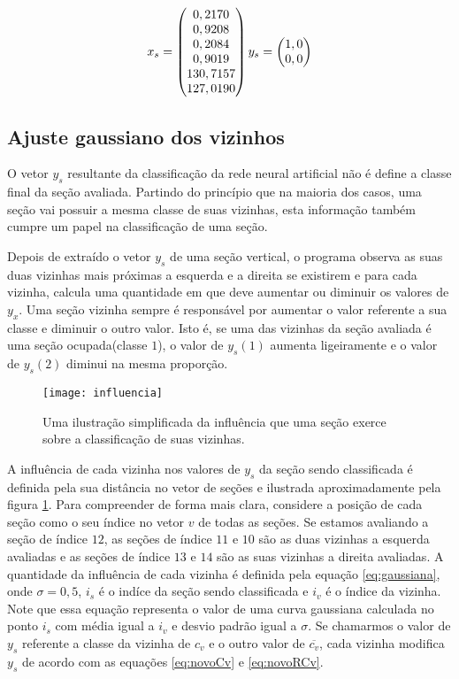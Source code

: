 \begin{equation}
\centering
	x_s = \begin{pmatrix}
	0,2170\\0,9208\\0,2084\\0,9019\\130,7157\\127,0190
	\end{pmatrix}
	y_s = \begin{pmatrix}
	1,0\\0,0
	\end{pmatrix}
\centering
\label{eq:vetoresRede}
\end{equation}


\subsection{Ajuste gaussiano dos vizinhos}

O vetor $y_s$ resultante da classificação da rede neural artificial não é define a classe final da seção avaliada. Partindo do princípio que na maioria dos casos, uma seção vai possuir a mesma classe de suas vizinhas, esta informação também cumpre um papel na classificação de uma seção. 

Depois de extraído o vetor $y_s$ de uma seção vertical, o programa observa as suas duas vizinhas mais próximas a esquerda e a direita se existirem e para cada vizinha, calcula uma quantidade em que deve aumentar ou diminuir os valores de $y_x$. Uma seção vizinha sempre é responsável por aumentar o valor referente a sua classe e diminuir o outro valor. Isto é, se uma das vizinhas da seção avaliada é uma seção ocupada(classe $1$), o valor de $y_s(1)$ aumenta ligeiramente e o valor de $y_s(2)$ diminui na mesma proporção.

\begin{figure}
\centering
\texttt{[image: influencia]}
\label{fig:influencia}
\caption{Uma ilustração simplificada da influência que uma seção exerce sobre a classificação de suas vizinhas.}
\centering
\end{figure}


A influência de cada vizinha nos valores de $y_s$ da seção sendo classificada é definida pela sua distância no vetor de seções e ilustrada aproximadamente pela figura \ref{fig:influencia}. Para compreender de forma mais clara, considere a posição de cada seção como o seu índice no vetor $v$ de todas as seções. Se estamos avaliando a seção de índice $12$, as seções de índice $11$ e $10$ são as duas vizinhas a esquerda avaliadas e as seções de índice $13$ e $14$ são as suas vizinhas a direita avaliadas. A quantidade da influência de cada vizinha é definida pela equação \ref{eq:gaussiana}, onde $\sigma = 0,5$, $i_s$ é o indíce da seção sendo classificada e $i_v$ é o índice da vizinha. Note que essa equação representa o valor de uma curva gaussiana calculada no ponto $i_s$ com média igual a $i_v$ e desvio padrão igual a $\sigma$. Se chamarmos o valor de $y_s$ referente a classe da vizinha de $c_v$ e o outro valor de $\overline{c_v}$, cada vizinha modifica $y_s$ de acordo com as equações \ref{eq:novoCv} e \ref{eq:novoRCv}.

